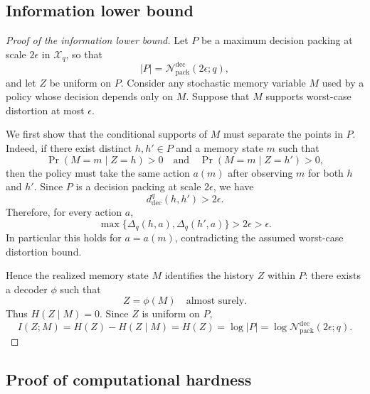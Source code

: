 \documentclass{article}
\theoremstyle{plain}
\theoremstyle{definition}
\theoremstyle{remark}
\newcommand{\cX}{\mathcal{X}}
\newcommand{\cN}{\mathcal{N}}
\newcommand{\eps}{\epsilon}
\begin{document}
\subsection{Information lower bound}
\label{app:info-lower-bound}
\begin{proof}[Proof of the information lower bound]
Let \(P\) be a maximum decision packing at scale \(2\eps\) in \(\cX_q\), so
that
\[
|P|=\cN^{\mathrm{dec}}_{\mathrm{pack}}(2\eps;q),
\]
and let \(Z\) be uniform on \(P\). Consider any stochastic memory variable
\(M\) used by a policy whose decision depends only on \(M\). Suppose that
\(M\) supports worst-case distortion at most \(\eps\).

We first show that the conditional supports of \(M\) must separate the
points in \(P\). Indeed, if there exist distinct \(h,h'\in P\) and a memory
state \(m\) such that
\[
\Pr(M=m\mid Z=h)>0
\quad\text{and}\quad
\Pr(M=m\mid Z=h')>0,
\]
then the policy must take the same action \(a(m)\) after observing \(m\) for
both \(h\) and \(h'\). Since \(P\) is a decision packing at scale \(2\eps\),
we have
\[
d_{\mathrm{dec}}^q(h,h')>2\eps.
\]
Therefore, for every action \(a\),
\[
\max\{\Delta_q(h,a),\Delta_q(h',a)\}>2\eps>\eps.
\]
In particular this holds for \(a=a(m)\), contradicting the assumed
worst-case distortion bound.

Hence the realized memory state \(M\) identifies the history \(Z\) within
\(P\): there exists a decoder \(\phi\) such that
\[
Z=\phi(M)
\quad\text{almost surely}.
\]
Thus \(H(Z\mid M)=0\). Since \(Z\) is uniform on \(P\),
\[
I(Z;M)
=
H(Z)-H(Z\mid M)
=
H(Z)
=
\log |P|
=
\log \cN^{\mathrm{dec}}_{\mathrm{pack}}(2\eps;q).
\]
\end{proof}

\subsection{Proof of computational hardness}
\label{app:proof-hardness}
\end{document}
